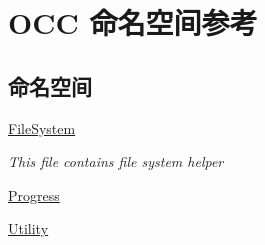 \hypertarget{namespace_o_c_c}{}\section{O\+CC 命名空间参考}
\label{namespace_o_c_c}
\subsection*{命名空间}
\begin{DoxyCompactItemize}
\item 
 \hyperlink{namespace_o_c_c_1_1_file_system}{File\+System}
\begin{DoxyCompactList}\small\item\em This file contains file system helper \end{DoxyCompactList}\item 
 \hyperlink{namespace_o_c_c_1_1_progress}{Progress}
\item 
 \hyperlink{namespace_o_c_c_1_1_utility}{Utility}
\end{DoxyCompactItemize}
